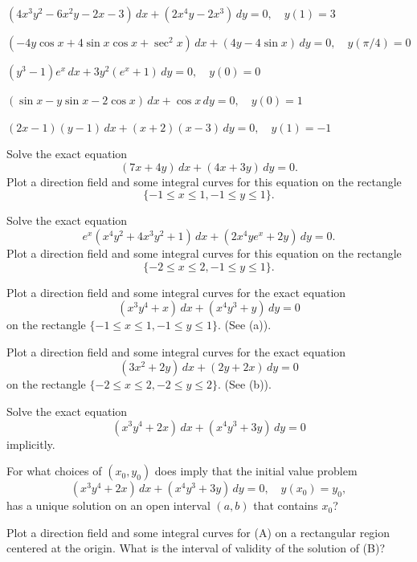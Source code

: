 \begin{exerciselist}

\item\label{exer:2.5.18}$(4x^3y^2-6x^2y-2x-3)\,dx+(2x^4y-2x^3)\,dy=0,\quad y(1)=3$

\item\label{exer:2.5.19}$(-4y\cos x+4\sin x\cos x+\sec^2x)\,dx+
(4y-4\sin x)\,dy=0,\quad y(\pi/4)=0$

\item\label{exer:2.5.20}$(y^3-1)e^x\,dx+3y^2(e^x+1)\,dy=0,\quad y(0)=0$

\item\label{exer:2.5.21}$(\sin x-y\sin x-2\cos x)\,dx+\cos x\,dy=0,\quad y(0)=1$

\item\label{exer:2.5.22}$(2x-1)(y-1)\,dx+(x+2)(x-3)\,dy=0,\quad y(1)=-1$

\item\label{exer:2.5.23}\CGex
Solve the exact equation
\[
(7x+4y)\,dx+(4x+3y)\,dy=0.
\]
Plot a direction field and some integral curves for this equation on
the rectangle
\[
\{-1\le x\le1,-1\le y\le1\}.
\]

\item\label{exer:2.5.24}\CGex
Solve the exact equation
\[
e^x(x^4y^2+4x^3y^2+1)\,dx+(2x^4ye^x+2y)\,dy=0.
\]
Plot a direction field and some integral curves for this equation on
the rectangle
\[
\{-2\le x\le2,-1\le y\le1\}.
\]

\item\label{exer:2.5.25}\CGex
Plot a direction field and some integral curves for the exact equation
\[
(x^3y^4+x)\,dx+(x^4y^3+y)\,dy=0
\]
on the rectangle $\{-1\le x\le 1,-1\le y\le1\}$. (See
(a)).

\item\label{exer:2.5.26}\CGex
Plot a direction field and some integral curves for the exact equation
\[
(3x^2+2y)\,dx+(2y+2x)\,dy=0
\]
on the rectangle $\{-2\le x\le 2,-2\le y\le2\}$. (See
(b)).

\item\label{exer:2.5.27}\Lex
\begin{alist}
\item %
Solve the exact equation
\[
(x^3y^4+2x)\,dx+(x^4y^3+3y)\,dy=0\tag{A}
\]
implicitly.
\item %
For what choices of $(x_0,y_0)$ does
 imply that the initial value problem
\[
(x^3y^4+2x)\,dx+(x^4y^3+3y)\,dy=0,\quad y(x_0)=y_0,\tag{B}
\]
has a unique solution on an open interval $(a,b)$  that contains $x_0$?
\item %
Plot a direction field and some integral curves for (A)
on a rectangular region centered at the origin. What is the
 interval of validity of the solution of (B)?
\end{alist}


\end{exerciselist}
